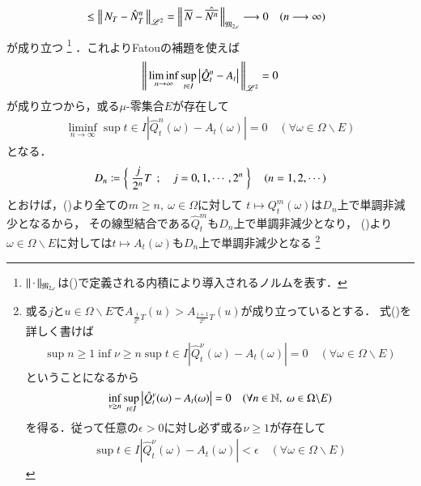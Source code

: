 \begin{prf}
\begin{description}
\begin{align}
					&\leq \left\|\, N_T - \hat{N}_T^n\, \right\|_{\mathscr{L}^2}
					= \left\|\, \overline{N} - \hat{\overline{N^n}}\, \right\|_{\mathfrak{M}_{2,c}} \longrightarrow 0 \quad (n \longrightarrow \infty) 
				\end{align}
				が成り立つ
				\footnote{
					$\left\|\, \cdot\, \right\|_{\mathfrak{M}_{2,c}}$は()で定義される内積により導入されるノルムを表す．
				}
				．これよりFatouの補題を使えば
				\begin{align}
					\left\|\, \liminf_{n \to \infty}\operatorname*{sup}_{t \in I} \left| \hat{Q}_t^n - A_t \right|\, \right\|_{\mathscr{L}^2} = 0
				\end{align}
				が成り立つから，或る$\mu$-零集合$E$が存在して
				\begin{align}
					\liminf_{n \to \infty}\sup{t \in I}{\left| \hat{Q}_t^n(\omega) - A_t(\omega) \right|} = 0 
					\quad (\forall \omega \in \Omega \backslash E)
					\label{eq:thm_quadratic_variation_1}
				\end{align}
				となる．
				\begin{align}
					D_n \coloneqq \left\{\ \frac{j}{2^n}T\ \, ; \quad  j = 0,1,\cdots,2^n \ \right\} \quad (n=1,2,\cdots)
				\end{align}
				とおけば，()より全ての$m \geq n,\ \omega \in \Omega$に対して
				$t \longmapsto Q_t^m(\omega)$は$D_n$上で単調非減少となるから，
				その線型結合である$\hat{Q}_t^m$も$D_n$上で単調非減少となり，
				()より
				$\omega \in \Omega \backslash E$に対しては$t \longmapsto A_t(\omega)$も$D_n$上で単調非減少となる
				\footnote{
					或る$j$と$u \in \Omega \backslash E$で$A_{\frac{j}{2^n}T}(u) > A_{\frac{j+1}{2^n}T}(u)$が成り立っているとする．
					式()を詳しく書けば
					\begin{align}
						\sup{n \geq 1}{\inf{\nu \geq n}{\sup{t \in I}{\left| \hat{Q}_t^\nu(\omega) - A_t(\omega) \right|}}} = 0 
						\quad (\forall \omega \in \Omega \backslash E)
					\end{align}
					ということになるから
					\begin{align}
						\operatorname*{inf}_{\nu \geq n} \operatorname*{sup}_{t \in I} \left| \hat{Q}_t^\nu(\omega) - A_t(\omega) \right| = 0 \quad (\forall n \in \mathbb{N},\ \omega \in \Omega \backslash E)
					\end{align}
					を得る．従って任意の$\epsilon > 0$に対し必ず或る$\nu \geq 1$が存在して
					\begin{align}
						\sup{t \in I}{\left| \hat{Q}_t^\nu(\omega) - A_t(\omega) \right|} < \epsilon \quad (\forall \omega \in \Omega \backslash E)

\end{align}}
\end{description}
\end{prf}
